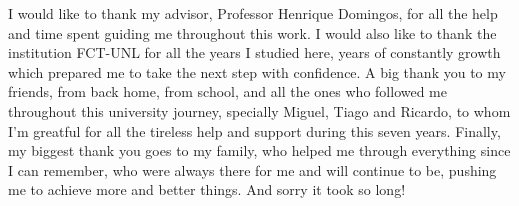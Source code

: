\acknowledgements

I would like to thank my advisor, Professor Henrique Domingos, for all the help and time spent guiding me throughout this work. I would also like to thank the institution FCT-UNL for all the years I studied here, years of constantly growth which prepared me to take the next step with confidence. A big thank you to my friends, from back home, from school, and all the ones who followed me throughout this university journey, specially Miguel, Tiago and Ricardo, to whom I'm greatful for all the tireless help and support during this seven years. Finally, my biggest thank you goes to my family, who helped me through everything since I can remember, who were always there for me and will continue to be, pushing me to achieve more and better things. And sorry it took so long!

